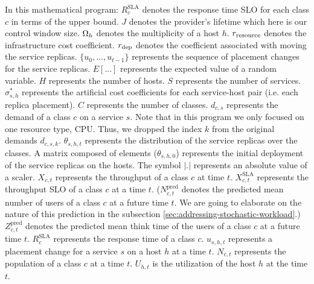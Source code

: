    In this mathematical program: $R_{c}^\text{SLA}$ denotes the response time SLO for each class $c$ in terms of the upper bound. 
   $J$ denotes the provider's lifetime which here is our control window size. 
	$\Omega_{h}$ denotes the multiplicity of a host $h$. 
	$r_{\text{resource}}$ denotes the infrastructure cost coefficient.
   $r_{\text{dep}}$ denotes the coefficient associated with moving the service replicas.
  $\{u_0,...,u_{t-1}\}$ represents the sequence of placement changes for the service replicas. 
   $E[...]$ represents the expected value of a random variable.
   $H$ represents the number of hosts. 
   $S$ represents the number of services. 
   $\sigma^*_{s,h}$  represents the artificial cost coefficients for each service-host pair (i.e. each replica placement). 
   $C$ represents the number of classes. 
   $d_{c,s} $  represents the demand of a class $c$ on a service $s$. Note that in this program we only focused on one resource type, CPU. Thus, we dropped the index $k$ from the original demands $d_{c,s,k}$. 
   $\theta_{s,h,t}$  represents the distribution of the service replicas over the classes. A matrix composed of elements ($\theta_{s,h,0}$) represents the initial deployment of the service replicas on the hosts.   
  The symbol $|.|$ represents an absolute value of a scaler.
 $X_{c,t}$ represents the throughput of a class $c$ at time $t$.  
 $X_{c,t}^\text{SLA}$ represents the throughput SLO of a class $c$ at a time $t$. 
 ($N^{\text{pred}}_{c,t}$ denotes the predicted mean number of users of a class $c$ at a future time $t$. We are going to elaborate on the nature of this prediction in the subsection \ref{sec:addressing-stochastic-workload}.)  
  $Z^{\text{pred}}_{c,t}$ denotes the predicted mean think time of the users of a class $c$ at a future time $t$.  
 $R_{c}^\text{SLA}$ represents the response time of a class $c$.  
 $u_{s,h,t}$ represents a placement change for a service $s$ on a host $h$ at a time $t$. 
 $N_{c,t}$  represents the population of a class $c$ at a time $t$.
 $U_{h,t}$ is the utilization of the host $h$ at the time $t$.  

